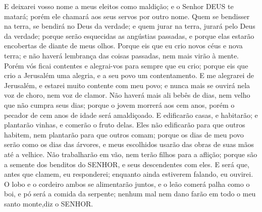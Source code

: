 {
E deixarei vosso nome a meus eleitos como maldição; e o Senhor DEUS te matará; porém ele chamará aos seus servos por outro nome.
Quem se bendisser na terra, se bendirá no Deus da verdade; e quem jurar na terra, jurará pelo Deus da verdade; porque serão esquecidas as angústias passadas, e porque elas estarão encobertas de diante de meus olhos.
Porque eis que eu crio novos céus e nova terra; e não haverá{} lembrança das coisas passadas, nem mais virão à mente.
Porém vós ficai contentes e alegrai-vos para sempre
{} que eu crio; porque eis que crio a Jerusalém uma alegria, e a seu povo um contentamento.
E me alegrarei de Jerusalém, e estarei muito contente com meu povo; e nunca mais se ouvirá nela voz de choro, nem voz de clamor.
Não haverá mais ali bebês de
{} dias, nem velho que não cumpra seus dias; porque o jovem morrerá aos cem anos, porém o pecador de cem anos de idade será amaldiçoado.
E edificarão casas, e
{} habitarão; e plantarão vinhas, e comerão o fruto delas.
Eles não edificarão para que outros habitem, nem plantarão para que outros comam; porque os dias de meu povo serão como os dias das árvores,
 e meus escolhidos usarão das obras de suas mãos até a velhice.
Não trabalharão em vão, nem terão filhos para a aflição; porque são a semente dos benditos do SENHOR, e seus descendentes com eles.
E será que, antes que clamem, eu responderei; enquanto ainda estiverem falando, eu ouvirei.
O lobo e o cordeiro ambos se alimentarão juntos, e o leão comerá palha como o boi, e pó será a comida da serpente; nenhum mal nem dano farão em todo o meu santo monte,diz o SENHOR.

}
